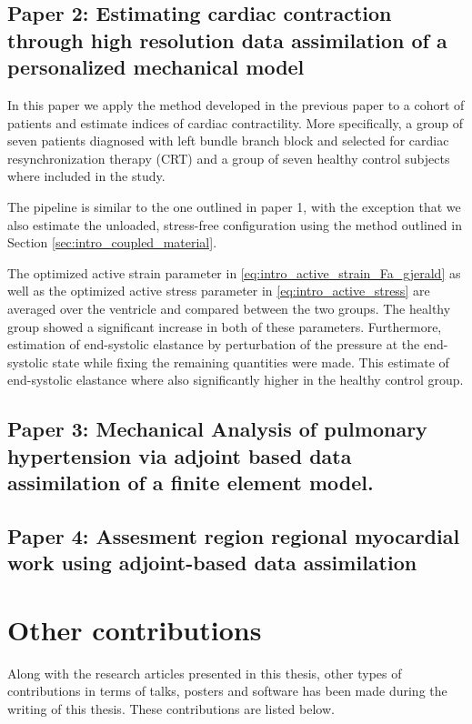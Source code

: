 \subsection{Paper 2: Estimating cardiac contraction through high resolution
  data assimilation of a personalized mechanical model}
In this paper we apply the method developed in the previous paper to a
cohort of patients and estimate indices of cardiac contractility. More
specifically, a group of seven patients diagnosed with left bundle branch block and
selected for cardiac resynchronization therapy (CRT) and a group of
seven healthy control subjects where included in the study.

The pipeline is similar to the one outlined in paper 1, with the
exception that we also estimate the unloaded, stress-free
configuration using the method outlined in Section
\ref{sec:intro_coupled_material}. 

The optimized active strain parameter in
\eqref{eq:intro_active_strain_Fa_gjerald} as well as the optimized
active stress parameter in \eqref{eq:intro_active_stress} are averaged
over the ventricle and compared between the two groups. The healthy
group showed a significant increase in both of these
parameters. Furthermore, estimation of end-systolic elastance by
perturbation of the pressure at the end-systolic state while fixing
the remaining quantities were made. This estimate of end-systolic
elastance where also significantly higher in the healthy control
group. 


\subsection{Paper 3: Mechanical Analysis of pulmonary hypertension via
  adjoint based data assimilation of a finite element model.}

\subsection{Paper 4: Assesment region regional myocardial work using
  adjoint-based data assimilation}

\newpage
\section{Other contributions}
Along with the research articles presented in this thesis, other
types of contributions in terms of talks, posters and software has
been made during the writing of this thesis. These contributions are
listed below.

